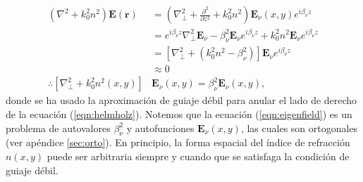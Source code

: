 \begin{align}
	(\nabla^2  + k_0^2n^2) \textbf{E}(\textbf{r}) &= \left(\nabla_\perp^2 + \frac{\partial^2}{\partial z^2} + k_0^2n^2\right) \textbf{E}_\nu(x, y)  e^{i\beta_\nu z} \nonumber
\\	
	&= e^{i\beta_\nu z} \nabla_\perp^2 \textbf{E}_\nu -\beta_\nu^2\textbf{E}_\nu e^{i\beta_\nu z} + k_0^2n^2 \textbf{E}_\nu  e^{i\beta_\nu z}
\nonumber	
	\\	
	&= \left[  \nabla_\perp^2  + (k_0^2n^2-\beta_\nu^2) \right]\textbf{E}_\nu  e^{i\beta_\nu z}
	\nonumber	
	\\
	&\approx
	0
	\nonumber
	\\
	\therefore
	 \left[  \nabla_\perp^2  + k_0^2n^2(x,y) \right]&\textbf{E}_\nu(x,y)  = \beta_\nu^2 \textbf{E}_\nu(x,y), \label{eqn:eigenfield}
\end{align}
donde se ha usado la aproximación de guiaje débil para anular el lado de derecho de la ecuación (\ref{eqn:helmholz}). Notemos que la ecuación (\ref{eqn:eigenfield}) es un problema de autovalores $\beta_\nu^2$ y autofunciones $\textbf{E}_\nu(x,y)$, las cuales son ortogonales (ver apéndice \ref{sec:orto}). En principio, la forma espacial del índice de refracción $n(x, y)$ puede ser arbitraria siempre y cuando que se satisfaga la condición de guiaje débil. 

